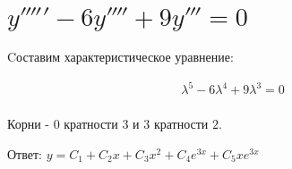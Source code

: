 

\section{$y''''' - 6 y'''' + 9y'''=0$}

Cоставим характеристическое уравнение:

\begin{align*}
    \lambda^5 - 6\lambda^4 + 9\lambda^3 = 0 \\
\end{align*}

Корни - $0$ кратности $3$ и $3$ кратности $2$.

Ответ: $y = C_1 + C_2x + C_3x^2 + C_4e^{3x} + C_5xe^{3x}$


